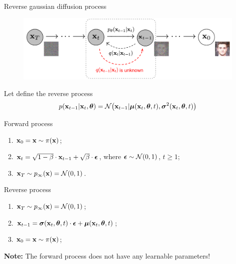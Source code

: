 \begin{frame}{Reverse gaussian diffusion process}
	\vspace{-0.3cm} 
	\begin{figure}
		\includegraphics[width=0.8\linewidth]{figs/DDPM}
	\end{figure}
	\vspace{-0.3cm} 
	Let define the reverse process
	\vspace{-0.2cm}
	\[
		p(\mathbf{x}_{t - 1} | \mathbf{x}_t, \boldsymbol{\theta}) = \mathcal{N} \bigl(\mathbf{x}_{t - 1} | \boldsymbol{\mu}(\mathbf{x}_t, \boldsymbol{\theta}, t), \boldsymbol{\sigma}^2(\mathbf{x}_t, \boldsymbol{\theta}, t)\bigr)
	\]
	\vspace{-0.5cm}
	\begin{minipage}{0.5\linewidth}
		\begin{block}{Forward process}
			\begin{enumerate}
				\item $\mathbf{x}_0 = \mathbf{x} \sim \pi(\mathbf{x})$;
				\item $\mathbf{x}_t = \sqrt{1 - \beta} \cdot \mathbf{x}_{t - 1} + \sqrt{\beta} \cdot \boldsymbol{\epsilon}$, where $\boldsymbol{\epsilon} \sim \mathcal{N}(0, 1)$, $t \geq 1$;
				\item $\mathbf{x}_T \sim p_{\infty}(\mathbf{x}) = \mathcal{N}(0, 1)$.
			\end{enumerate}
		\end{block}
	\end{minipage}%
	\begin{minipage}{0.5\linewidth}
		\begin{block}{Reverse process}
			\begin{enumerate}
				\item $\mathbf{x}_T \sim p_{\infty}(\mathbf{x}) = \mathcal{N}(0, 1)$;
				\item $\mathbf{x}_{t - 1} = \boldsymbol{\sigma}(\mathbf{x}_t, \boldsymbol{\theta}, t) \cdot \boldsymbol{\epsilon} + \boldsymbol{\mu}(\mathbf{x}_t, \boldsymbol{\theta}, t)$;
				\item $\mathbf{x}_0 = \mathbf{x} \sim \pi(\mathbf{x})$;
			\end{enumerate}
		\end{block}
	\end{minipage}
	\textbf{Note:} The forward process does not have any learnable parameters!
\end{frame}
